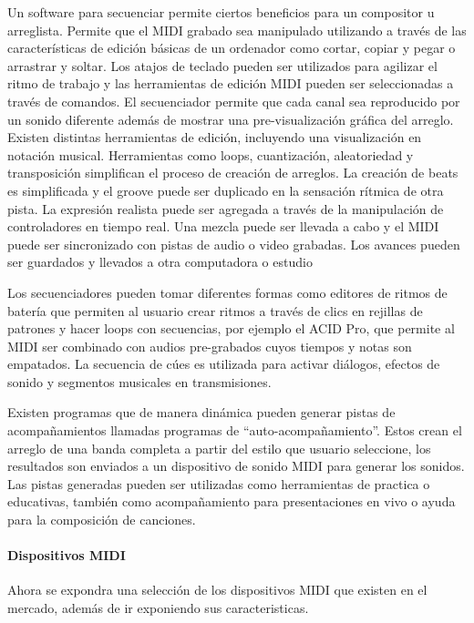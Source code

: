\documentclass[a4paper,11pt,oneside]{book}
\begin{document}
Un software para secuenciar permite ciertos beneficios para un compositor u arreglista. Permite que el MIDI grabado sea manipulado utilizando a través de las características de edición básicas de un ordenador como cortar, copiar y pegar o arrastrar y soltar. Los atajos de teclado pueden ser utilizados para agilizar el ritmo de trabajo y las herramientas de edición MIDI pueden ser seleccionadas a través de comandos. El secuenciador permite que cada canal sea reproducido por un sonido diferente además de mostrar una pre-visualización gráfica del arreglo. Existen distintas herramientas de edición, incluyendo una visualización en notación musical. Herramientas como loops, cuantización, aleatoriedad y transposición simplifican el proceso de creación de arreglos. La creación de beats es simplificada y el groove puede ser duplicado en la sensación rítmica de otra pista. La expresión realista puede ser agregada a través de la manipulación de controladores en tiempo real. Una mezcla puede ser llevada a cabo y el MIDI puede ser sincronizado con pistas de audio o video grabadas. Los avances pueden ser guardados y llevados a otra computadora o estudio

Los secuenciadores pueden tomar diferentes formas como editores de ritmos de batería que permiten al usuario crear ritmos a través de clics en rejillas de patrones y hacer loops con secuencias, por ejemplo el ACID Pro, que permite al MIDI ser combinado con audios pre-grabados cuyos tiempos y notas son empatados. La secuencia de cúes es utilizada para activar diálogos, efectos de sonido y segmentos musicales en transmisiones.

Existen programas que de manera dinámica pueden generar pistas de acompañamientos llamadas programas de ``auto-acompañamiento''. Estos crean el arreglo de una banda completa a partir del estilo que usuario seleccione, los resultados son enviados a un dispositivo de sonido MIDI para generar los sonidos. Las pistas generadas pueden ser utilizadas como herramientas de practica o educativas, también como acompañamiento para presentaciones en vivo o ayuda para la composición de canciones.

\paragraph{Dispositivos MIDI}

Ahora se expondra una selección de los dispositivos MIDI que existen en el mercado, además de ir exponiendo sus caracteristicas.
\end{document}
